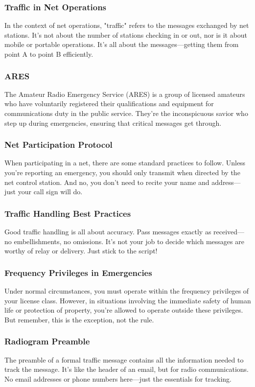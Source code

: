 \subsubsection*{Traffic in Net Operations}
In the context of net operations, "traffic" refers to the messages exchanged by net stations. It's not about the number of stations checking in or out, nor is it about mobile or portable operations. It's all about the messages—getting them from point A to point B efficiently.

\subsubsection*{ARES}
The Amateur Radio Emergency Service (ARES) is a group of licensed amateurs who have voluntarily registered their qualifications and equipment for communications duty in the public service. They're the inconspicuous savior who step up during emergencies, ensuring that critical messages get through.

\subsubsection*{Net Participation Protocol}
When participating in a net, there are some standard practices to follow. Unless you're reporting an emergency, you should only transmit when directed by the net control station. And no, you don't need to recite your name and address—just your call sign will do.

\subsubsection*{Traffic Handling Best Practices}
Good traffic handling is all about accuracy. Pass messages exactly as received—no embellishments, no omissions. It's not your job to decide which messages are worthy of relay or delivery. Just stick to the script!

\subsubsection*{Frequency Privileges in Emergencies}
Under normal circumstances, you must operate within the frequency privileges of your license class. However, in situations involving the immediate safety of human life or protection of property, you're allowed to operate outside these privileges. But remember, this is the exception, not the rule.

\subsubsection*{Radiogram Preamble}
The preamble of a formal traffic message contains all the information needed to track the message. It's like the header of an email, but for radio communications. No email addresses or phone numbers here—just the essentials for tracking.

